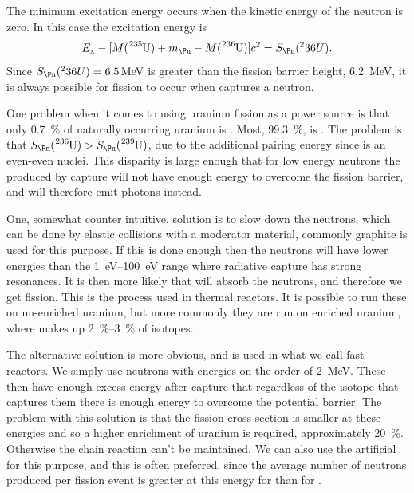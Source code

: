 \documentclass[fleqn]{NotesClass}
\begin{document}
    The minimum excitation energy occurs when the kinetic energy of the neutron is zero.
    In this case the excitation energy is
    \begin{equation}
        E_{\mathrm{x}} - [M(\ce{^235U}) + m_{\Pn} - M(\ce{^236U})]c^2 = S_{\Pn}(^236U).
    \end{equation}
    Since \(S_\Pn(^236U) = \qty{6.5}{\MeV}\) is greater than the fission barrier height, \qty{6.2}{\MeV}, it is always possible for fission to occur when  captures a neutron.
    
    One problem when it comes to using uranium fission as a power source is that only \qty{0.7}{\percent} of naturally occurring uranium is .
    Most, \qty{99.3}{\percent}, is .
    The problem is that \(S_{\Pn}(\ce{^236U}) > S_{\Pn}(\ce{^239U})\), due to the additional pairing energy since  is an even-even nuclei.
    This disparity is large enough that for low energy neutrons the  produced by capture will not have enough energy to overcome the fission barrier, and will therefore emit photons instead.
    
    One, somewhat counter intuitive, solution is to slow down the neutrons, which can be done by elastic collisions with a moderator material, commonly graphite is used for this purpose.
    If this is done enough then the neutrons will have lower energies than the \qtyrange{1}{100}{\electronvolt} range where radiative capture has strong resonances.
    It is then more likely that  will absorb the neutrons, and therefore we get fission.
    This is the process used in thermal reactors.
    It is possible to run these on un-enriched uranium, but more commonly they are run on enriched uranium, where  makes up \qtyrange{2}{3}{\percent} of isotopes.
    
    The alternative solution is more obvious, and is used in what we call fast reactors.
    We simply use neutrons with energies on the order of \qty{2}{\MeV}.
    These then have enough excess energy after capture that regardless of the isotope that captures them there is enough energy to overcome the potential barrier.
    The problem with this solution is that the fission cross section is smaller at these energies and so a higher enrichment of uranium is required, approximately \qty{20}{\percent}.
    Otherwise the chain reaction can't be maintained.
    We can also use the artificial  for this purpose, and this is often preferred, since the average number of neutrons produced per fission event is greater at this energy for  than for .
    
\end{document}
